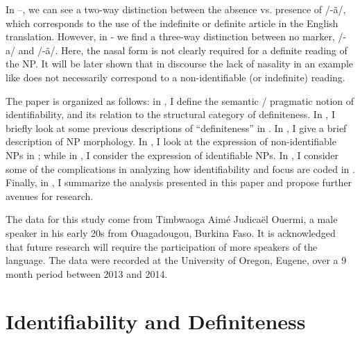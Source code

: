 \documentclass[output=paper]{langsci/langscibook}
\begin{document}
In –, we can see a two-way distinction between the absence vs. presence of /-ã/, which corresponds to the use of the indefinite or definite article in the English translation. However, in - we find a three-way distinction between no marker, /-a/ and /-ã/. Here, the nasal form is not clearly required for a definite reading of the NP. It will be later shown that in discourse the lack of nasality in an example like  does not necessarily correspond to a non-identifiable (or indefinite) reading.

The paper is organized as follows: in , I define the semantic / pragmatic notion of identifiability, and its relation to the structural category of definiteness. In , I briefly look at some previous descriptions of “definiteness” in . In , I give a brief description of NP morphology. In , I look at the expression of non-identifiable NPs in ; while in , I consider the expression of identifiable NPs. In , I consider some of the complications in analyzing how identifiability and focus are coded in . Finally, in , I summarize the analysis presented in this paper and propose further avenues for research.

The data for this study come from Timbwaoga Aimé Judicaël Ouermi, a male  speaker in his early 20s from Ouagadougou, Burkina Faso. It is acknowledged that future research will require the participation of more speakers of the language. The data were recorded at the University of Oregon, Eugene, over a 9 month period between 2013 and 2014. 


\section{Identifiability and Definiteness}\label{sec:teo:2}
\end{document}
